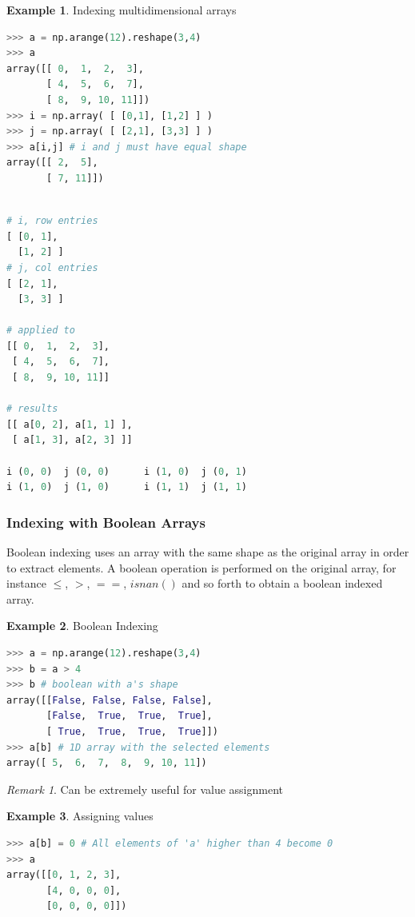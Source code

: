 \documentclass{article}
\theoremstyle{definition}
\newtheorem{ex}{Example}[subsection]
\theoremstyle{remark}
\newtheorem*{rem}{Remark}
\begin{document}
\begin{ex}Indexing multidimensional arrays
\begin{lstlisting}[language=Python]
>>> a = np.arange(12).reshape(3,4)
>>> a
array([[ 0,  1,  2,  3],
       [ 4,  5,  6,  7],
       [ 8,  9, 10, 11]])
>>> i = np.array( [ [0,1], [1,2] ] )
>>> j = np.array( [ [2,1], [3,3] ] )
>>> a[i,j] # i and j must have equal shape
array([[ 2,  5],
       [ 7, 11]])
\end{lstlisting}

\begin{lstlisting}[language=Python]

# i, row entries
[ [0, 1], 
  [1, 2] ] 
# j, col entries 
[ [2, 1],
  [3, 3] ] 

# applied to
[[ 0,  1,  2,  3],
 [ 4,  5,  6,  7],
 [ 8,  9, 10, 11]]

# results 
[[ a[0, 2], a[1, 1] ], 
 [ a[1, 3], a[2, 3] ]] 

i (0, 0)  j (0, 0)      i (1, 0)  j (0, 1)
i (1, 0)  j (1, 0)      i (1, 1)  j (1, 1)

\end{lstlisting}
\end{ex}

\subsubsection{Indexing with Boolean Arrays}

Boolean indexing uses an array with the same shape as the original array in order to extract elements. A boolean operation is performed on the original array, for instance $ \le $, $ > $, $ == $, $ isnan() $ and so forth to obtain a boolean indexed array.

\begin{ex}Boolean Indexing
\begin{lstlisting}[language=Python]
>>> a = np.arange(12).reshape(3,4)
>>> b = a > 4
>>> b # boolean with a's shape
array([[False, False, False, False],
       [False,  True,  True,  True],
       [ True,  True,  True,  True]])
>>> a[b] # 1D array with the selected elements
array([ 5,  6,  7,  8,  9, 10, 11])
\end{lstlisting}
\end{ex}

\begin{rem}
Can be extremely useful for value assignment
\end{rem}

\begin{ex} Assigning values
\begin{lstlisting}[language=Python]
>>> a[b] = 0 # All elements of 'a' higher than 4 become 0
>>> a
array([[0, 1, 2, 3],
       [4, 0, 0, 0],
       [0, 0, 0, 0]])
\end{lstlisting}
\end{ex}
\end{document}
